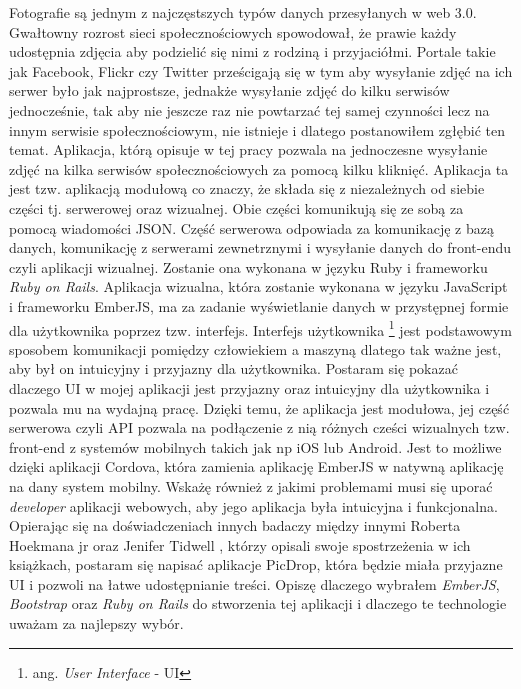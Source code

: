 \documentclass[brudnopis]{xmgr}
\begin{document}
\maketitle
%
\introduction
Fotografie są jednym z najczęstszych typów danych przesyłanych w web 3.0. Gwałtowny rozrost sieci społecznościowych spowodował, że prawie każdy udostępnia zdjęcia aby podzielić się nimi z rodziną i przyjaciółmi. Portale takie jak Facebook, Flickr czy Twitter prześcigają się w tym aby wysyłanie zdjęć na ich serwer było jak najprostsze, jednakże wysyłanie zdjęć do kilku serwisów jednocześnie, tak aby nie jeszcze raz nie powtarzać tej samej czynności lecz na innym serwisie społecznościowym, nie istnieje i dlatego postanowiłem zgłębić ten temat. 
Aplikacja, którą opisuje w tej pracy pozwala na jednoczesne wysyłanie zdjęć na kilka serwisów społecznościowych za pomocą kilku kliknięć. Aplikacja ta jest tzw. aplikacją modułową co znaczy, że składa się z  niezależnych od siebie części tj. serwerowej oraz wizualnej. Obie części komunikują się ze sobą za pomocą wiadomości JSON. Część serwerowa odpowiada za komunikację z bazą danych, komunikację z serwerami zewnetrznymi i wysyłanie danych do front-endu czyli aplikacji wizualnej. Zostanie ona wykonana w języku Ruby i frameworku \textit{Ruby on Rails}.   Aplikacja wizualna, która zostanie wykonana w języku JavaScript i frameworku EmberJS, ma za zadanie wyświetlanie danych w przystępnej formie dla użytkownika poprzez tzw. interfejs. Interfejs użytkownika \footnote{ang. \textit{User Interface} - UI}  jest podstawowym sposobem komunikacji pomiędzy człowiekiem a maszyną dlatego tak ważne jest, aby był on intuicyjny i przyjazny dla użytkownika. Postaram się pokazać dlaczego UI w mojej aplikacji jest przyjazny oraz intuicyjny dla użytkownika i pozwala mu na wydajną pracę. Dzięki temu, że aplikacja jest modułowa, jej część serwerowa czyli API pozwala na podłączenie z nią różnych cześci wizualnych tzw. front-end z systemów mobilnych takich jak np iOS lub Android. Jest to możliwe dzięki aplikacji Cordova, która zamienia aplikację EmberJS w natywną aplikację na dany system mobilny. Wskażę również z jakimi problemami musi się uporać \textit{developer} aplikacji webowych, aby jego aplikacja była intuicyjna i funkcjonalna. Opierając się na  doświadczeniach innych badaczy  między innymi Roberta Hoekmana jr  \cite {magiaUI} oraz Jenifer Tidwell  \cite {projektowanieUI}, którzy opisali swoje spostrzeżenia w ich książkach, postaram się napisać aplikacje PicDrop, która  będzie miała przyjazne UI i pozwoli na łatwe udostępnianie treści. Opiszę dlaczego wybrałem \textit{EmberJS}, \textit{Bootstrap} oraz \textit{Ruby on Rails} do stworzenia tej aplikacji i dlaczego te technologie uważam za najlepszy wybór.
\end{document}
